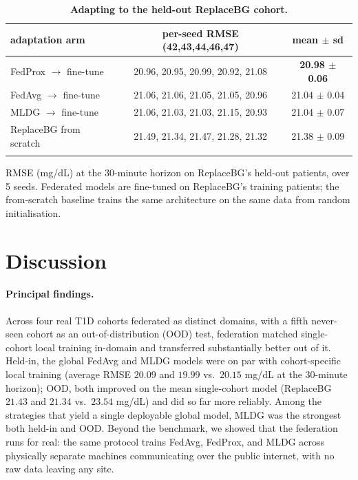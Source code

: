 \documentclass[10pt,letterpaper]{article}
\newlength\savedwidth
\newcommand\thickhline{\noalign{\global\savedwidth\arrayrulewidth\global\arrayrulewidth 2pt}%
\hline
\noalign{\global\arrayrulewidth\savedwidth}}
\begin{document}
\begin{table}[!ht]
\centering
\captionsetup{justification=centering,singlelinecheck=on}
\caption{\bf Adapting to the held-out ReplaceBG cohort.}
\label{tab:replacebg-adapt}
\begin{tabular}{lcc}
\thickhline
adaptation arm & per-seed RMSE (42,43,44,46,47) & mean $\pm$ sd \\
\hline
FedProx $\rightarrow$ fine-tune & 20.96, 20.95, 20.99, 20.92, 21.08 & \textbf{20.98 $\pm$ 0.06} \\
FedAvg $\rightarrow$ fine-tune  & 21.06, 21.06, 21.05, 21.05, 20.96 & 21.04 $\pm$ 0.04 \\
MLDG $\rightarrow$ fine-tune    & 21.06, 21.03, 21.03, 21.15, 20.93 & 21.04 $\pm$ 0.07 \\
ReplaceBG from scratch          & 21.49, 21.34, 21.47, 21.28, 21.32 & 21.38 $\pm$ 0.09 \\
\thickhline
\end{tabular}
\begin{center}
{\small RMSE (mg/dL) at the 30-minute horizon on ReplaceBG's held-out patients,
over 5 seeds. Federated models are fine-tuned on ReplaceBG's training patients;
the from-scratch baseline trains the same architecture on the same data from
random initialisation.}
\end{center}
\end{table}

\section*{Discussion}

\paragraph{Principal findings.} Across four real T1D cohorts federated as
distinct domains, with a fifth never-seen cohort as an out-of-distribution (OOD)
test, federation matched single-cohort local training in-domain and transferred
substantially better out of it. Held-in, the global FedAvg and MLDG models were
on par with cohort-specific local training (average RMSE $20.09$ and $19.99$
vs.\ $20.15$ mg/dL at the 30-minute horizon); OOD, both improved on the mean
single-cohort model (ReplaceBG $21.43$ and $21.34$ vs.\ $23.54$ mg/dL) and did
so far more reliably. Among the strategies that yield a single deployable global
model, MLDG was the strongest both held-in and OOD. Beyond the benchmark, we
showed that the federation runs for real: the same protocol trains FedAvg,
FedProx, and MLDG across physically separate machines communicating over the
public internet, with no raw data leaving any site.
\end{document}
